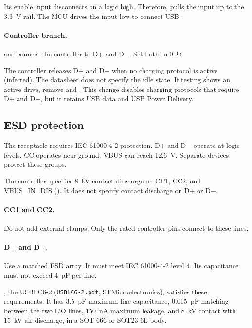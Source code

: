 Its enable input disconnects on a logic high. Therefore,  pulls
the input up to the 3.3~V rail. The MCU drives the input low to connect USB.

\paragraph{Controller branch.}  and  connect the
controller to D+ and D$-$. Set both to \SI{0}{\ohm}.

The controller releases D+ and D$-$ when no charging protocol is active
(inferred). The datasheet does not specify the idle state. If testing shows an
active drive, remove  and . This change disables
charging protocols that require D+ and D$-$, but it retains USB data and USB
Power Delivery.

\subsection{ESD protection}\label{sec:pd-esd}

The receptacle requires IEC 61000-4-2 protection. D+ and D$-$ operate at logic
levels. CC operates near ground. VBUS can reach \SI{12.6}{\volt}. Separate
devices protect these groups.

The controller specifies \SI{8}{\kilo\volt} contact discharge on CC1, CC2, and
VBUS\_IN\_DIS (). It does not
specify contact discharge on D+ or D$-$.

\paragraph{CC1 and CC2.} Do not add external clamps. Only the rated controller
pins connect to these lines.

\paragraph{D+ and D$-$.} Use a matched ESD array. It must meet IEC 61000-4-2
level 4. Its capacitance must not exceed \SI{4}{\pico\farad} per line.

, the USBLC6-2 (\texttt{USBLC6-2.pdf}, STMicroelectronics),
satisfies these requirements. It has \SI{3.5}{\pico\farad} maximum line capacitance,
\SI{0.015}{\pico\farad} matching between the two I/O lines,
\SI{150}{\nano\ampere} maximum leakage, and \SI{8}{\kilo\volt} contact with
\SI{15}{\kilo\volt} air discharge, in a SOT-666 or SOT23-6L body.

